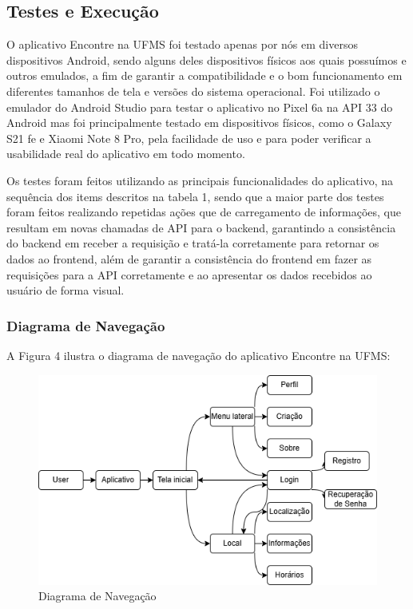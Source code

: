 \subsection{Testes e Execução}

    O aplicativo Encontre na UFMS foi testado apenas por nós em diversos dispositivos Android, sendo alguns deles dispositivos físicos aos quais possuímos e outros emulados, a fim de garantir a compatibilidade e o bom funcionamento em diferentes tamanhos de tela e versões do sistema operacional. Foi utilizado o emulador do Android Studio para testar o aplicativo no Pixel 6a na API 33 do Android mas foi principalmente testado em dispositivos físicos, como o Galaxy S21 fe e Xiaomi Note 8 Pro, pela facilidade de uso e para poder verificar a usabilidade real do aplicativo em todo momento.
    
    Os testes foram feitos utilizando as principais funcionalidades do aplicativo, na sequência dos items descritos na tabela 1, sendo que a maior parte dos testes foram feitos realizando repetidas ações que de carregamento de informações, que resultam em novas chamadas de API para o backend, garantindo a consistência do backend em receber a requisição e tratá-la corretamente para retornar os dados ao frontend, além de garantir a consistência do frontend em fazer as requisições para a API corretamente e ao apresentar os dados recebidos ao usuário de forma visual.

\subsubsection{Diagrama de Navegação}

    A Figura 4 ilustra o diagrama de navegação do aplicativo Encontre na UFMS:

    \begin{figure}[h]
        \centering
        \includegraphics[width=1\textwidth]{imagens/navegacao.png}
        \caption{\scriptsize Diagrama de Navegação}
        \label{fig:diagrama-navegacao}
    \end{figure}


